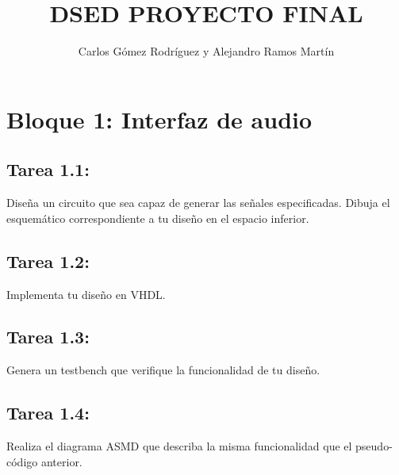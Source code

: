 \documentclass{article}
\title{DSED PROYECTO FINAL}
\author{Carlos Gómez Rodríguez y Alejandro Ramos Martín}
\begin{document}
\maketitle

\tableofcontents

\newpage

\section{Bloque 1: Interfaz de audio}

\subsection{Tarea 1.1:}
Diseña un circuito que sea capaz de generar las señales especificadas. Dibuja el esquemático correspondiente a tu diseño en el espacio inferior.

\subsection{Tarea 1.2:}
Implementa tu diseño en VHDL.

\subsection{Tarea 1.3:}
Genera un testbench que verifique la funcionalidad de tu diseño.
\newpage
\subsection{Tarea 1.4:}
Realiza el diagrama ASMD que describa la misma funcionalidad que el pseudo-código anterior.
\end{document}
